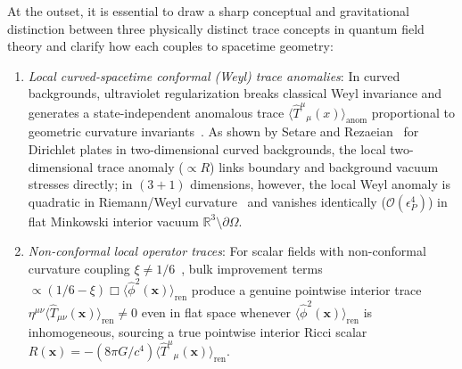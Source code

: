 \documentclass[aps,prd,twocolumn,10pt,showkeys,nofootinbib,floatfix,longbibliography]{revtex4-2}
\begin{document}
At the outset, it is essential to draw a sharp conceptual and gravitational distinction between three physically distinct trace concepts in quantum field theory and clarify how each couples to spacetime geometry:
\begin{enumerate}
    \item \emph{Local curved-spacetime conformal (Weyl) trace anomalies}: In curved backgrounds, ultraviolet regularization breaks classical Weyl invariance and generates a state-independent anomalous trace $\langle \hat{T}^\mu{}_\mu(x)\rangle_{\mathrm{anom}}$ proportional to geometric curvature invariants~\cite{birrell1982,duff1994}. As shown by Setare and Rezaeian~\cite{setare2000} for Dirichlet plates in two-dimensional curved backgrounds, the local two-dimensional trace anomaly ($\propto R$) links boundary and background vacuum stresses directly; in $(3+1)$ dimensions, however, the local Weyl anomaly is quadratic in Riemann/Weyl curvature~\cite{duff1994} and vanishes identically ($\mathcal{O}(\epsilon_P^4)$) in flat Minkowski interior vacuum $\mathbb{R}^3 \setminus \partial\Omega$.
    \item \emph{Non-conformal local operator traces}: For scalar fields with non-conformal curvature coupling $\xi \neq 1/6$~\cite{callan1970,deutsch1979,milton2016}, bulk improvement terms $\propto (1/6 - \xi)\Box\langle\hat{\phi}^2(\mathbf{x})\rangle_{\mathrm{ren}}$ produce a genuine pointwise interior trace $\eta^{\mu\nu}\langle\hat{T}_{\mu\nu}(\mathbf{x})\rangle_{\mathrm{ren}} \neq 0$ even in flat space whenever $\langle\hat{\phi}^2(\mathbf{x})\rangle_{\mathrm{ren}}$ is inhomogeneous, sourcing a true pointwise interior Ricci scalar $R(\mathbf{x}) = -(8\pi G/c^4)\langle\hat{T}^\mu{}_\mu(\mathbf{x})\rangle_{\mathrm{ren}}$.

\end{enumerate}
\end{document}
